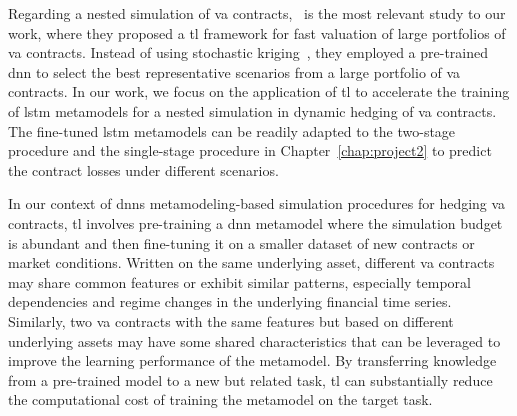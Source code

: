 Regarding a nested simulation of \gls{va} contracts,~\cite{cheng2019fast} is the most relevant study to our work, where they proposed a \gls{tl} framework for fast valuation of large portfolios of \gls{va} contracts.
Instead of using stochastic kriging~\citep{gan2015valuation}, they employed a pre-trained \gls{dnn} to select the best representative scenarios from a large portfolio of \gls{va} contracts.
In our work, we focus on the application of \gls{tl} to accelerate the training of \gls{lstm} metamodels for a nested simulation in dynamic hedging of \gls{va} contracts.
The fine-tuned \gls{lstm} metamodels can be readily adapted to the two-stage procedure and the single-stage procedure in Chapter~\ref{chap:project2} to predict the contract losses under different scenarios.

In our context of \gls{dnn}s metamodeling-based simulation procedures for hedging \gls{va} contracts, \gls{tl} involves pre-training a \gls{dnn} metamodel where the simulation budget is abundant and then fine-tuning it on a smaller dataset of new contracts or market conditions.
Written on the same underlying asset, different \gls{va} contracts may share common features or exhibit similar patterns, especially temporal dependencies and regime changes in the underlying financial time series.
Similarly, two \gls{va} contracts with the same features but based on different underlying assets may have some shared characteristics that can be leveraged to improve the learning performance of the metamodel.
By transferring knowledge from a pre-trained model to a new but related task, \gls{tl} can substantially reduce the computational cost of training the metamodel on the target task.

